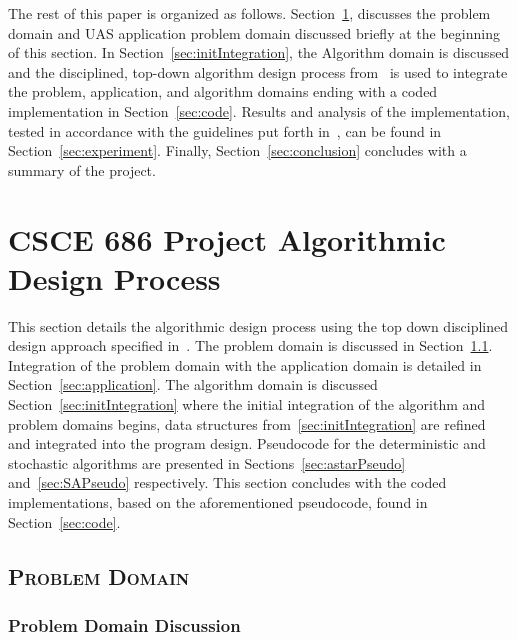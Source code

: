 \documentclass[conference]{IEEEtran}
\begin{document}
The rest of this paper is organized as follows.
Section~\ref{sec:designProcess}, discusses the problem domain and UAS
application problem domain discussed briefly at the beginning of this section.
In Section~\ref{sec:initIntegration}, the Algorithm domain is discussed and the
disciplined, top-down algorithm design process from~\cite{lamontDesign,
lamontSCP, lamontMIS} is used to integrate the problem, application, and
algorithm domains ending with a coded implementation in Section~\ref{sec:code}.
Results and analysis of the implementation, tested in accordance with the
guidelines put forth in~\cite{barr2001}, can be found in
Section~\ref{sec:experiment}. Finally, Section~\ref{sec:conclusion} concludes
with a summary of the project.

\section{CSCE 686 Project Algorithmic Design Process} \label{sec:designProcess}


This section details the algorithmic design process using the top down
disciplined design approach specified in~\cite{lamontDesign, lamontSCP}. The
problem domain is discussed in Section~\ref{sec:problemDomain}. Integration of
the problem domain with the application domain is detailed in
Section~\ref{sec:application}. The algorithm domain is discussed
Section~\ref{sec:initIntegration} where the initial integration of the
algorithm and problem domains begins, data structures
from~\ref{sec:initIntegration} are refined and integrated into the program
design.  Pseudocode for the deterministic and stochastic algorithms are
presented in Sections~\ref{sec:astarPseudo} and~\ref{sec:SAPseudo}
respectively. This section concludes with the coded implementations, based on
the aforementioned pseudocode, found in Section~\ref{sec:code}.




\subsection{\textsc{Problem Domain}} \label{sec:problemDomain}

\subsubsection{Problem Domain Discussion}
\end{document}
